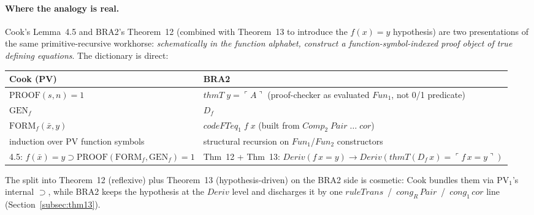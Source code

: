 \documentclass[11pt]{article}
\begin{document}
\paragraph{Where the analogy is real.}
Cook's Lemma~4.5 and BRA2's Theorem~12 (combined with Theorem~13 to
introduce the $f(x) = y$ hypothesis) are two presentations of the
same primitive-recursive workhorse: \emph{schematically in the
function alphabet, construct a function-symbol-indexed proof object
of true defining equations}.  The dictionary is direct:
\begin{center}
\begin{tabular}{l|l}
Cook (PV)                           & BRA2 \\\hline
$\mathrm{PROOF}(s, n) = 1$          & $\mathit{thmT}\;y = \ulcorner A\urcorner$
                                      (proof-checker as evaluated $\mathit{Fun}_1$, not 0/1 predicate) \\
$\mathrm{GEN}_f$                    & $D_f$ \\
$\mathrm{FORM}_f(\bar x, y)$        & $\mathit{codeFTeq}_1\;f\;x$ (built from $\mathit{Comp}_2\;\mathit{Pair}\;\dots\;\mathit{cor}$) \\
induction over PV function symbols  & structural recursion on $\mathit{Fun}_1$/$\mathit{Fun}_2$ constructors \\
4.5: $f(\bar x)=y \supset \mathrm{PROOF}(\mathrm{FORM}_f, \mathrm{GEN}_f)=1$
                                    & Thm~12 + Thm~13:
                                      $\mathit{Deriv}(f\,x = y) \to
                                       \mathit{Deriv}(\mathit{thmT}(D_f\,x) =
                                       \ulcorner f\,x = y\urcorner)$ \\
\end{tabular}
\end{center}
The split into Theorem~12 (reflexive) plus Theorem~13 (hypothesis-driven)
on the BRA2 side is cosmetic: Cook bundles them via $\mathrm{PV}_1$'s
internal $\supset$, while BRA2 keeps the hypothesis at the
$\mathit{Deriv}$ level and discharges it by one
$\mathit{ruleTrans}$~/~$\mathit{cong}_R\,\mathit{Pair}$~/~$\mathit{cong}_1\,\mathit{cor}$
line (Section~\ref{subsec:thm13}).
\end{document}

